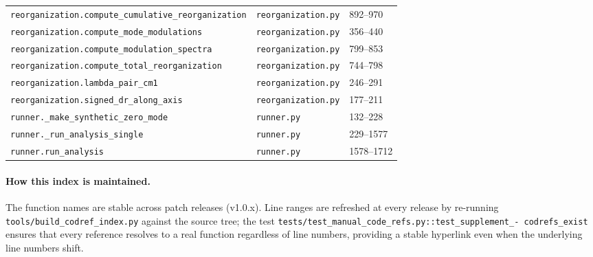 \documentclass[10pt,a4paper,twoside]{article}
\newcommand{\fn}[1]{\texttt{#1}}
\begin{document}
\begin{longtable}{p{} p{} p{}}
\texttt{reorganization.compute\_cumulative\_reorganization} & \texttt{reorganization.py} & 892--970 \\
\texttt{reorganization.compute\_mode\_modulations}    & \texttt{reorganization.py} & 356--440  \\
\texttt{reorganization.compute\_modulation\_spectra}  & \texttt{reorganization.py} & 799--853  \\
\texttt{reorganization.compute\_total\_reorganization} & \texttt{reorganization.py} & 744--798 \\
\texttt{reorganization.lambda\_pair\_cm1}             & \texttt{reorganization.py} & 246--291  \\
\texttt{reorganization.signed\_dr\_along\_axis}       & \texttt{reorganization.py} & 177--211  \\
\texttt{runner.\_make\_synthetic\_zero\_mode}         & \texttt{runner.py}         & 132--228  \\
\texttt{runner.\_run\_analysis\_single}               & \texttt{runner.py}         & 229--1577 \\
\texttt{runner.run\_analysis}                         & \texttt{runner.py}         & 1578--1712 \\
\bottomrule
\end{longtable}

\paragraph{How this index is maintained.}
The function names are stable across patch releases (v1.0.x). Line
ranges are refreshed at every release by re-running
\fn{tools/build\_codref\_index.py} against the source tree;
the test \fn{tests/test\_manual\_code\_refs.py::test\_supplement\_-
codrefs\_exist} ensures that every reference resolves to a real
function regardless of line numbers, providing a stable
hyperlink even when the underlying line numbers shift.
\end{document}
